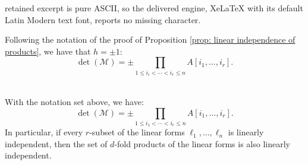 \documentclass[10pt,a4paper]{amsart}
\begin{document}
retained excerpt is pure ASCII, so the delivered engine, XeLaTeX with its default Latin Modern text font, reports no missing character.
\begin{lemma}\label{lem:LT-generic}
    Following the notation of the proof of Proposition \ref{prop: linear independence of products}, we have that $h=\pm 1$:
    \begin{equation}\label{eqn:lem-LT}
        \det(\mathcal{M})=\pm\prod_{1\leq i_i<\cdots<i_r\leq n}A[i_1,\ldots, i_r].
    \end{equation}\
\end{lemma}

\begin{proposition}\label{prop: linear independence of products}
With the notation set above, we have:
\begin{equation}
\det(\mathcal{M})=\pm\prod_{1\leq i_1<\cdots<i_r\leq n}A[i_1,\ldots, i_r]. 
\end{equation}
In particular, if every $r$-subset of the linear forms $\ell_1,\ldots,\ell_n$ is linearly independent, then the set of $d$-fold products of the linear forms is also linearly independent.
\end{proposition}
\end{document}
